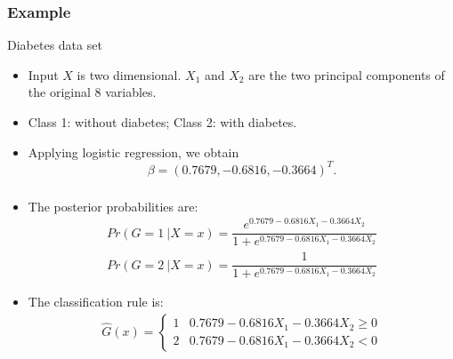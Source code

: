 \documentclass[12pt,notes,mathserif]{beamer}
\begin{document}
\begin{frame}[c]
	\frametitle{Example}
	Diabetes data set

	\begin{itemize}
		\item  Input $X$ is two dimensional. $X_1$ and $X_2$ are the two principal components of the original 8 variables.
		\item Class 1: without diabetes; Class 2: with diabetes.
		\item Applying logistic regression, we obtain
		      \begin{equation*}
			      \beta = (0.7679,−0.6816,−0.3664)^T.
		      \end{equation*}
	\end{itemize}
\end{frame}

\begin{frame}[c]
	\frametitle{}
	\begin{itemize}
		\item  The posterior probabilities are:
		      \begin{gather*}
			      Pr(G=1~|X=x)=\dfrac{e^{0.7679−0.6816X_1 −0.3664X_2}}{1 + e^{0.7679−0.6816X_1 −0.3664X_2}}\\
			      Pr(G=2~|X=x)=\dfrac{1}{1 + e^{0.7679−0.6816X_1 −0.3664X_2}}
		      \end{gather*}
		\item The classification rule is:
		      \begin{gather*}
			      \hat{G}(x)=
			      \left\{
			      \begin{array}{ll}
				      1 & 0.7679 − 0.6816X_1 − 0.3664X_2 \geqslant{} 0 \\
				      2 & 0.7679 − 0.6816X_1 − 0.3664X_2 < 0
			      \end{array}
			      \right.
		      \end{gather*}
	\end{itemize}
\end{frame}
\end{document}
